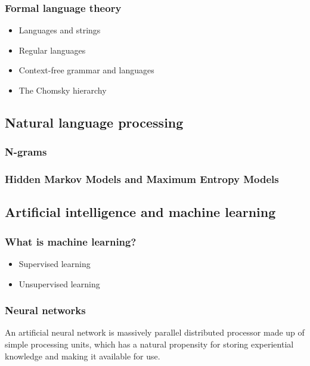 \subsubsection{Formal language theory}
\label{sec:formalgrammars}
\begin{itemize}
  \item Languages and strings
  \item Regular languages
  \item Context-free grammar and languages
  \item The Chomsky hierarchy
\end{itemize}

\subsection{Natural language processing}
\label{sec:nlp}

\subsubsection{N-grams}
\label{sec:ngrams}

\subsubsection{Hidden Markov Models and Maximum Entropy Models}
\label{sec:hmm-maxent}

\subsection{Artificial intelligence and machine learning}
\label{sec:aiml}

\subsubsection{What is machine learning?}
\label{sec:statistics}
\begin{itemize}
  \item Supervised learning
  \item Unsupervised learning
\end{itemize}

\subsubsection{Neural networks}
\label{sec:neuralnetworks}

An artificial neural network is massively parallel distributed
processor made up of simple processing units, which has a natural
propensity for storing experiential knowledge and making it available
for use.

